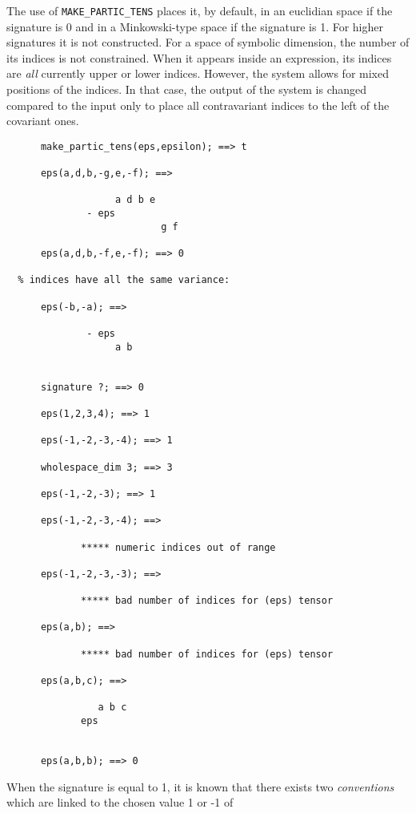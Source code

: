 The use of \texttt{MAKE\_PARTIC\_TENS} places it, by default, in an
euclidian space if the signature is 0 and in a Minkowski-type space if 
the signature is 1. 
For higher signatures it is not constructed.
For a space of symbolic dimension, the number of its indices is not 
constrained. When it appears inside an expression, its indices are \emph{all}
currently upper or lower indices. However, the system allows for 
mixed positions of the indices. In that case, the output of the system 
is changed compared to the input  only to place all contravariant indices
to the left of the covariant ones.
\begin{verbatim}
      make_partic_tens(eps,epsilon); ==> t
 
      eps(a,d,b,-g,e,-f); ==>

                   a d b e
              - eps
                           g f

      eps(a,d,b,-f,e,-f); ==> 0

  % indices have all the same variance:
 
      eps(-b,-a); ==>

              - eps
                   a b


      signature ?; ==> 0

      eps(1,2,3,4); ==> 1

      eps(-1,-2,-3,-4); ==> 1

      wholespace_dim 3; ==> 3

      eps(-1,-2,-3); ==> 1

      eps(-1,-2,-3,-4); ==> 
           
             ***** numeric indices out of range

      eps(-1,-2,-3,-3); ==> 

             ***** bad number of indices for (eps) tensor

      eps(a,b); ==> 

             ***** bad number of indices for (eps) tensor

      eps(a,b,c); ==> 

                a b c
             eps

   
      eps(a,b,b); ==> 0

\end{verbatim}
When the signature is equal to 1, it is known that 
there exists
two \emph{conventions} which are linked to the chosen value 1 or -1 of 
